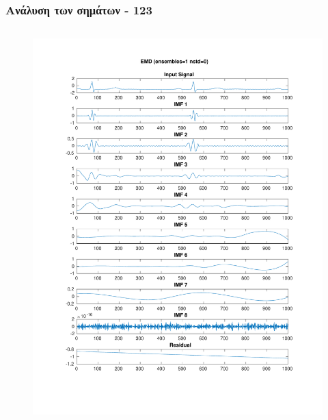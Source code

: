 \documentclass{beamer}
\begin{document}
\begin{frame}
\frametitle{Ανάλυση των σημάτων - 123}

\begin{columns}
\begin{figure}
\includegraphics[width=\textwidth]{fig/123l1_emd.pdf}
\end{figure}


\end{columns}
\end{frame}
\end{document}
